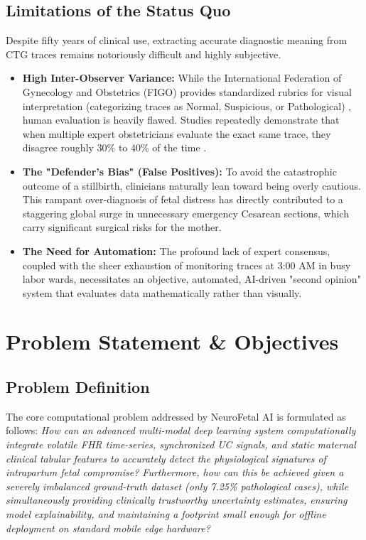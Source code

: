 \documentclass[12pt,a4paper]{report}
\begin{document}
\section{Limitations of the Status Quo}
Despite fifty years of clinical use, extracting accurate diagnostic meaning from CTG traces remains notoriously difficult and highly subjective. 
\begin{itemize}
    \item \textbf{High Inter-Observer Variance:} While the International Federation of Gynecology and Obstetrics (FIGO) provides standardized rubrics for visual interpretation (categorizing traces as Normal, Suspicious, or Pathological) \cite{figo}, human evaluation is heavily flawed. Studies repeatedly demonstrate that when multiple expert obstetricians evaluate the exact same trace, they disagree roughly 30\% to 40\% of the time \cite{bernardes}.
    \item \textbf{The "Defender's Bias" (False Positives):} To avoid the catastrophic outcome of a stillbirth, clinicians naturally lean toward being overly cautious. This rampant over-diagnosis of fetal distress has directly contributed to a staggering global surge in unnecessary emergency Cesarean sections, which carry significant surgical risks for the mother. 
    \item \textbf{The Need for Automation:} The profound lack of expert consensus, coupled with the sheer exhaustion of monitoring traces at 3:00 AM in busy labor wards, necessitates an objective, automated, AI-driven "second opinion" system that evaluates data mathematically rather than visually.
\end{itemize}

\chapter{Problem Statement \& Objectives}
\section{Problem Definition}
The core computational problem addressed by NeuroFetal AI is formulated as follows: 
\textit{How can an advanced multi-modal deep learning system computationally integrate volatile FHR time-series, synchronized UC signals, and static maternal clinical tabular features to accurately detect the physiological signatures of intrapartum fetal compromise? Furthermore, how can this be achieved given a severely imbalanced ground-truth dataset (only 7.25\% pathological cases), while simultaneously providing clinically trustworthy uncertainty estimates, ensuring model explainability, and maintaining a footprint small enough for offline deployment on standard mobile edge hardware?}
\end{document}
